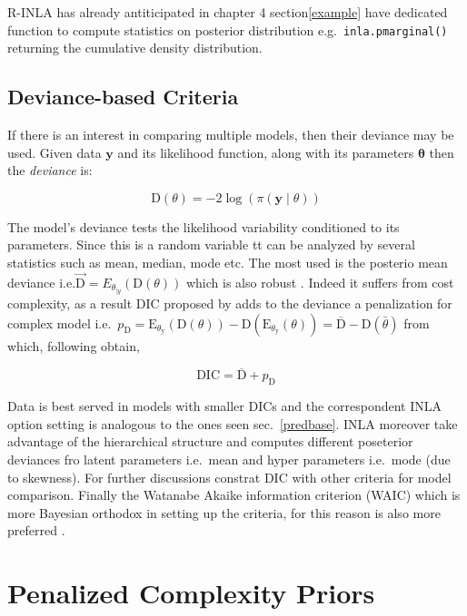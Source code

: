 \documentclass[
  12pt,
  a4paper,
  oneside]{book}
\newcommand{\passthrough}[1]{#1}
\theoremstyle{definition}
\theoremstyle{definition}
\theoremstyle{definition}
\theoremstyle{remark}
\begin{document}
R-INLA has already antiticipated in chapter 4 section\ref{example} have dedicated function to compute statistics on posterior distribution e.g.~\passthrough{\lstinline!inla.pmarginal()!} returning the cumulative density distribution.

\hypertarget{deviance-based-criteria}{%
\subsection{Deviance-based Criteria}\label{deviance-based-criteria}}

If there is an interest in comparing multiple models, then their deviance may be used. Given data \(\boldsymbol{y}\) and its likelihood function, along with its parameters \(\boldsymbol\theta\) then the \emph{deviance} is:

\[
\mathrm{D}(\theta)=-2 \log (\pi(\boldsymbol{y} \mid \theta))
\]

The model's deviance tests the likelihood variability conditioned to its parameters. Since this is a random variable tt can be analyzed by several statistics such as mean, median, mode etc. The most used is the posterio mean deviance i.e.\(\overrightarrow{\mathrm{D}}=E_{\theta_{\mid y}}(\mathrm{D}(\theta))\) which is also robust \citep{Blangiaro-Cameletti}. Indeed it suffers from cost complexity, as a result DIC proposed by \citet{spiegelhalter2002bayesian} adds to the deviance a penalization for complex model i.e.~\(p_{\mathrm{D}}=\mathrm{E}_{\theta_{\mathrm{y}}}(\mathrm{D}(\theta))-\mathrm{D}\left(\mathrm{E}_{\theta_{\mathrm{y}}}(\theta)\right)=\overline{\mathrm{D}}-\mathrm{D}(\bar{\theta})\) from which, following \citet{Blangiaro-Cameletti} obtain,

\[\mathrm{DIC}=\overline{\mathrm{D}}+p_{\mathrm{D}}\]

Data is best served in models with smaller DICs and the correspondent INLA option setting is analogous to the ones seen sec.~\ref{predbase}. INLA moreover take advantage of the hierarchical structure and computes different poseterior deviances fro latent parameters i.e.~mean and hyper parameters i.e.~mode (due to skewness). For further discussions \citet{spiegelhalter2014deviance} constrat DIC with other criteria for model comparison. Finally the Watanabe Akaike information criterion (WAIC) which is more Bayesian orthodox in setting up the criteria, for this reason is also more preferred \citep{gelman2014understanding}.

\hypertarget{priorsspec}{%
\section{Penalized Complexity Priors}\label{priorsspec}}
\end{document}
